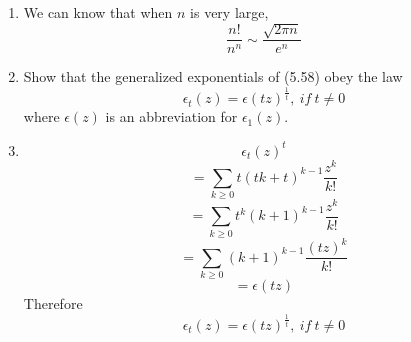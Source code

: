 \documentclass[12pt,a4paper]{article}
\makeatletter
\newtheorem*{solution}{Solution}
\theoremstyle{definition}
\renewenvironment{solution}[1][Solution] {\par\pushQED{\qed}\normalfont\topsep6\p@\@plus6\p@\relax\trivlist\item[\hskip\labelsep\bfseries#1\@addpunct{.}]\ignorespaces}{\popQED\endtrivlist\@endpefalse} \makeatother
\makeatother
\begin{document}
\begin{enumerate}
\begin{solution}
        	We can know that when $n$ is very large,
        	\begin{equation*}
        	    \frac{n!}{n^n}\sim\frac{\sqrt{2\pi n}}{e^n}
        	\end{equation*}
        \end{solution}
    \item 
        Show that the generalized exponentials of (5.58) obey the law
        \begin{equation*}
            \epsilon_t(z)=\epsilon(tz)^{\frac{1}{t}},\ if\ t\neq 0
        \end{equation*}
        where $\epsilon(z)$ is an abbreviation for $\epsilon_1(z)$.
        \begin{solution}
        	\begin{equation*}
        	    \epsilon_t(z)^{t}
        	\end{equation*}
        	\begin{equation*}
        	    =\sum_{k\ge 0}t(tk+t)^{k-1}\frac{z^k}{k!}
        	\end{equation*}
        	\begin{equation*}
        	    =\sum_{k\ge 0}t^k(k+1)^{k-1}\frac{z^k}{k!}
        	\end{equation*}
        	\begin{equation*}
        	    =\sum_{k\ge 0}(k+1)^{k-1}\frac{(tz)^k}{k!}
        	\end{equation*}
        	\begin{equation*}
        	    =\epsilon(tz)
        	\end{equation*}
        	Therefore
        	\begin{equation*}
        	    \epsilon_t(z)=\epsilon(tz)^{\frac{1}{t}},\ if\ t\neq 0
        	\end{equation*}
        \end{solution}
\end{enumerate}

\end{document}

